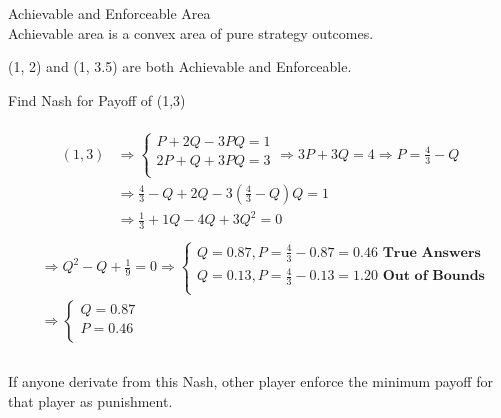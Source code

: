 \documentclass[
  course = {{IE579 Game Theory and Multi-Agent Reinforcement Learning}},
  quartile = {{4}},
  assignment = 2,
  name = {{Mohammad Mahdi Rahimi}},
  studentnumber = {{20208244}},
  email = {{mahi@kaist.ac.kr}},
  firstexercise = 1
]{aga-homework}
\begin{document}
\subexercise Achievable and Enforceable Area\\
Achievable area is a convex area of pure strategy outcomes.
\begin{center}
\end{center}
(1, 2) and (1, 3.5) are both Achievable and Enforceable.

\subexercise Find Nash for Payoff of (1,3)
\\\\
\begin{equation} \label{eq1}
\begin{split}
(1,3) & \Rightarrow \begin{cases}
       P + 2Q - 3PQ = 1\\
       2P + Q + 3PQ = 3\\
     \end{cases} \Rightarrow 3P + 3Q = 4 \Rightarrow P = \frac{4}{3} - Q \\
& \Rightarrow \frac{4}{3} - Q + 2Q - 3(\frac{4}{3} - Q)Q = 1 \\
& \Rightarrow \frac{1}{3} + 1Q - 4Q + 3Q^2 = 0 \\
\end{split}
\end{equation}
\begin{equation} \label{eq1}
\begin{split}
& \Rightarrow Q^2 - Q + \frac{1}{9} = 0 \Rightarrow \begin{cases}
       Q = 0.87, P = \frac{4}{3} - 0.87 = 0.46 \textbf{ True Answers}\\
       Q = 0.13, P = \frac{4}{3} - 0.13 = 1.20 \textbf{ Out of Bounds}\\
     \end{cases}\\
& \Rightarrow \begin{cases}
       Q = 0.87\\
       P = 0.46\\
     \end{cases}\\
\end{split}
\end{equation}\\
If anyone derivate from this Nash, other player enforce the minimum payoff for that player as punishment.
\end{document}
